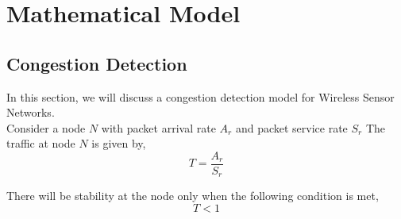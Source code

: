 \documentclass[journal]{IEEEtran}
\begin{document}
\section{Mathematical Model}

\subsection{Congestion Detection}
In this section, we will discuss a congestion detection model for Wireless Sensor Networks.\\
Consider a node $N$ with packet arrival rate $A_r$ and packet service rate $S_r$
The traffic at node $N$ is given by,
\begin{equation}
T=\frac{A_r}{S_r}
\end{equation}

There will be stability at the node only when the following condition is met,
\begin{equation}
T<1
\end{equation}
\end{document}
